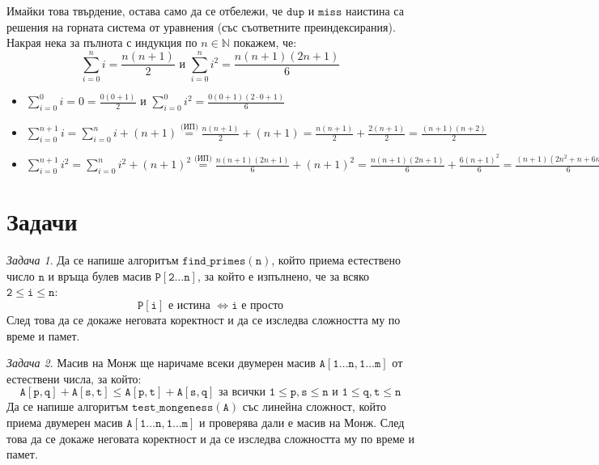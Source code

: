 \documentclass{article}
\theoremstyle{definition}
\theoremstyle{plain}
\theoremstyle{remark}
\newtheorem{problem}{Задача}
\theoremstyle{definition}
\begin{document}
Имайки това твърдение, остава само да се отбележи, че $\mathtt{dup}$ и $\mathtt{miss}$ наистина са решения на горната система от уравнения (със съответните преиндексирания).
Накрая нека за пълнота с индукция по $n \in \mathbb{N}$ покажем, че:
\[
  \sum\limits_{i = 0}^n i = \frac{n(n + 1)}{2} \text{ и } \sum\limits_{i = 0}^n i^2 = \frac{n(n + 1)(2n + 1)}{6}
\]
\begin{itemize}
  \item $\sum\limits_{i = 0}^0 i = 0 = \frac{0(0 + 1)}{2}$ и $\sum\limits_{i = 0}^0 i^2 = \frac{0(0 + 1)(2 \cdot 0 + 1)}{6}$ \checkmark
  \item $\sum\limits_{i = 0}^{n + 1} i = \sum\limits_{i = 0}^{n} i + (n + 1) \stackrel{\text{(ИП)}}{=} \frac{n(n + 1)}{2} + (n + 1) = \frac{n(n + 1)}{2} + \frac{2(n + 1)}{2} = \frac{(n + 1)(n + 2)}{2}$
  \item $\sum\limits_{i = 0}^{n + 1} i^2 = \sum\limits_{i = 0}^{n} i^2 + (n + 1)^2 \stackrel{\text{(ИП)}}{=} \frac{n(n + 1)(2n + 1)}{6} + (n + 1)^2 = \frac{n(n + 1)(2n + 1)}{6} + \frac{6(n + 1)^2}{6} = \frac{(n + 1)(2n^2 + n + 6n + 6)}{6} = \frac{(n + 1)(n + 2)(2(n + 1) + 1)}{6}$
\end{itemize}

\section*{Задачи}

\begin{problem}
Да се напише алгоритъм $\mathtt{find\_primes(n)}$, който приема естествено число $\mathtt{n}$ и връща булев масив $\mathtt{P[2 \dots n]}$, за който е изпълнено, че за всяко $\mathtt{2 \leq i \leq n}$:
\[
  \mathtt{P[i] \text{ е истина } \iff i \text{ е просто}}
\]
След това да се докаже неговата коректност и да се изследва сложността му по време и памет.
\end{problem}

\begin{problem}
Масив на Монж ще наричаме всеки двумерен масив $\mathtt{A[1 \dots n, 1 \dots m]}$ от естествени числа, за който:
\[
  \mathtt{A[p, q] + A[s, t] \leq A[p, t] + A[s, q] \text{ за всички } 1 \leq p, s \leq n \text{ и } 1 \leq q, t \leq n}
\]
Да се напише алгоритъм $\mathtt{test\_mongeness(A)}$ със линейна сложност, който приема двумерен масив $\mathtt{A[1 \dots n, 1 \dots m]}$ и проверява дали е масив на Монж.
След това да се докаже неговата коректност и да се изследва сложността му по време и памет.
\end{problem}
\end{document}
